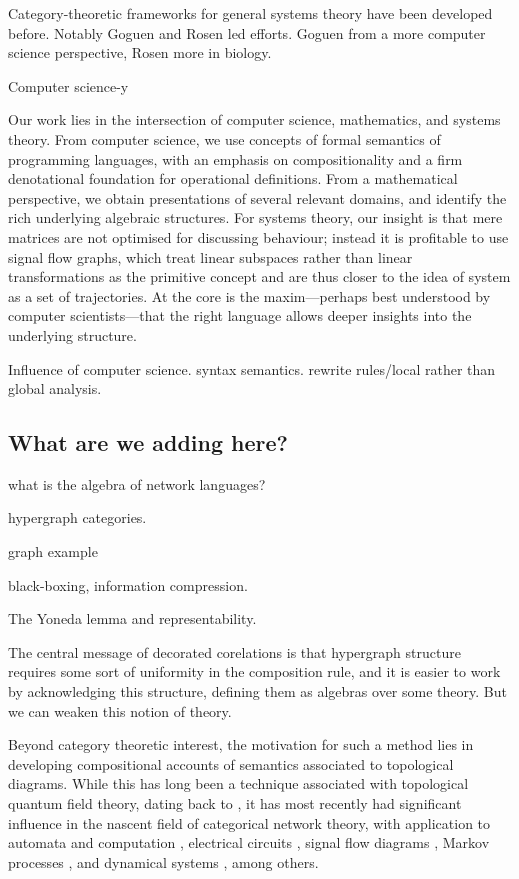 Category-theoretic frameworks for general systems theory have been developed
before. Notably Goguen and Rosen led efforts. Goguen from a more computer
science perspective, Rosen more in biology.


Computer science-y

Our work lies in the intersection of computer science, mathematics, and systems
theory.  From computer science, we use concepts  of formal semantics of
programming languages, with an emphasis on compositionality and a firm
denotational foundation for operational definitions.  From a mathematical
perspective, we obtain presentations of several relevant domains, and identify
the rich underlying algebraic structures.  For systems theory, our insight is
that mere matrices are not optimised for discussing behaviour; instead it is
profitable to use signal flow graphs, which treat linear subspaces rather than
linear transformations as the primitive concept and are thus closer to the idea
of system as a set of trajectories. At the core is the maxim---perhaps best
understood by computer scientists---that the right language allows deeper
insights into the underlying structure.

Influence of computer science. syntax semantics. rewrite rules/local rather than
global analysis.

\subsection*{What are we adding here?}


what is the algebra of network languages?

hypergraph categories.

graph example

black-boxing, information compression.

The Yoneda lemma and representability.

The central message of decorated corelations is that hypergraph structure
requires some sort of uniformity in the composition rule, and it is easier to
work by acknowledging this structure, defining them as algebras over some
theory. But we can weaken this notion of theory.

Beyond category theoretic interest, the motivation for such a method lies in
developing compositional accounts of semantics associated to topological
diagrams. While this has long been a technique associated with topological
quantum field theory, dating back to \cite{At}, it has most recently had
significant influence in the nascent field of categorical network theory, with
application to automata and computation \cite{KSW2, Sp}, electrical circuits
\cite{BF}, signal flow diagrams \cite{BSZ, BE}, Markov processes \cite{BFP,
ASW}, and dynamical systems \cite{VSL}, among others. 

